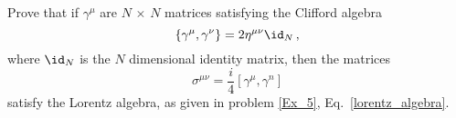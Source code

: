 \begin{ex} \label{ex_15} 
    Prove that if $\gamma^\mu$ are $N\,\times\,N$ matrices satisfying the Clifford algebra
    \begin{equation}
        \{ \gamma^\mu, \gamma^\nu \} = 2 \g^{\mu \nu} \id_N \,,
    \end{equation}
    where $\id_N$ is the $N$ dimensional identity matrix, then the matrices
    \begin{equation}
        \sigma^{\mu \nu} = \frac{i}{4} \left[ \gamma^\mu, \gamma^n \right] 
    \end{equation}
    satisfy the Lorentz algebra, as given in problem \ref{Ex_5}, Eq.~\eqref{lorentz_algebra}.
\end{ex}


